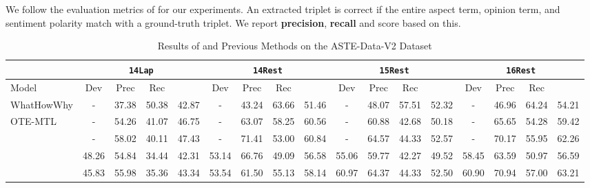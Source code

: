 \documentclass[sigconf]{acmart}
\begin{document}
\begin{table}[ht!]
We follow the evaluation metrics of \citet{xu2020position} for our experiments. An extracted triplet is correct if the entire aspect term, opinion term, and sentiment polarity match with a ground-truth triplet. We report \textbf{precision}, \textbf{recall} and  score based on this.








\begin{table*}[ht!]
\small
\caption{Results of \mymodel{} and Previous Methods on the ASTE-Data-V2 Dataset}
\resizebox{0.8\linewidth}{!}
{
\label{tab:main_results}
\centering
\begin{tabular}{l|cccc|cccc|cccc|cccc}
\toprule
     & \multicolumn{4}{c|}{\texttt{14Lap}}                & \multicolumn{4}{c|}{\texttt{14Rest}}         
     & \multicolumn{4}{c|}{\texttt{15Rest}} 
     & \multicolumn{4}{c}{\texttt{16Rest}} \\ \hline
Model            & Dev                 & Prec                 & Rec                  &                     & Dev                 & Prec                 & Rec                  &              & Dev                 & Prec                 & Rec                  &        & Dev                 & Prec                 & Rec                  &               \\ \midrule
WhatHowWhy \cite{peng2020knowing} &            -           & 37.38                 & 50.38                 & 42.87                 &           -            & 43.24                 & 63.66                 & 51.46                 & - & 48.07	& 57.51	& 52.32 & - & 46.96	& 64.24	& 54.21\\
OTE-MTL \cite{zhang2020multi} & - & 54.26 & 41.07 & 46.75 & - & 63.07 & 58.25 & 60.56 & - & 60.88 & 42.68 & 50.18 & - & 65.65 & 54.28 & 59.42 \\
 \cite{wu2020grid} & - & 58.02 & 40.11 & 47.43 & - & 71.41 & 53.00 & 60.84 & - & 64.57 & 44.33 & 52.57 & - & 70.17 & 55.95 & 62.26 \\
 \cite{xu2020position}             &  48.26  & 54.84                  & 34.44                 & 42.31                 & 53.14 & 66.76                 & 49.09                 & 56.58      & 55.06 & 59.77 & 42.27 & 49.52         & 58.45 & 63.59 & 50.97 & 56.59 \\ 
 \cite{xu2020position}             &  45.83  & 55.98                  & 35.36                 & 43.34                 & 53.54 & 61.50                 & 55.13                 & 58.14   & 60.97   & 64.37	& 44.33	& 52.50       & 60.90  & 70.94	& 57.00	& 63.21 \\

\end{tabular}}
\end{table*}
\end{table}
\end{document}
